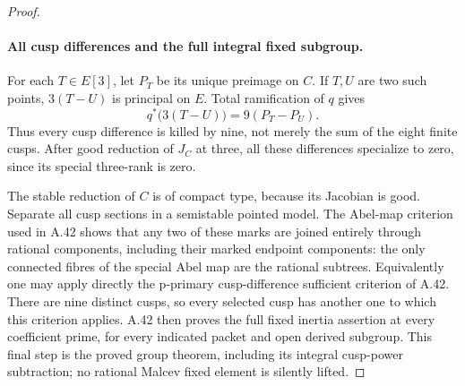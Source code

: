 \begin{proof}
\paragraph{All cusp differences and the full integral fixed subgroup.}
For each \(T\in E[3]\), let \(P_T\) be
its unique preimage on \(C\). If \(T,U\)
are two such points, \(3(T-U)\) is principal
on \(E\). Total ramification of \(q\)
gives
\[
             q^*\bigl(3(T-U)\bigr)
                           =9(P_T-P_U).             \tag{A.51.14}
\]
Thus every cusp difference is killed by nine,
not merely the sum of the eight finite cusps.
After good reduction of \(J_C\) at three,
all these differences specialize to zero,
since its special three-rank is zero.

The stable reduction of \(C\) is of compact
type, because its Jacobian is good. Separate
all cusp sections in a semistable pointed model.
The Abel-map criterion used in A.42 shows that
any two of these marks are joined entirely
through rational components, including their
marked endpoint components: the only connected
fibres of the special Abel map are the rational
subtrees. Equivalently one may apply directly
the p-primary cusp-difference sufficient
criterion of A.42. There are nine distinct
cusps, so every selected cusp has another one
to which this criterion applies.
A.42 then proves the full fixed inertia assertion
at every coefficient prime, for every indicated
packet and open derived subgroup. This final
step is the proved group theorem, including its
integral cusp-power subtraction; no rational
Malcev fixed element is silently lifted.
\end{proof}
